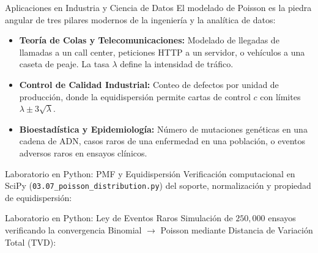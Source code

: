 \documentclass[10pt, aspectratio=169]{beamer}
\begin{document}
\begin{frame}{Aplicaciones en Industria y Ciencia de Datos}
  \footnotesize
  El modelado de Poisson es la piedra angular de tres pilares modernos de la ingeniería y la analítica de datos: \pause

  \vspace{0.15cm}
  \begin{itemize}\itemsep=0.15cm
    \item \textbf{Teoría de Colas y Telecomunicaciones:} Modelado de llegadas de llamadas a un call center, peticiones HTTP a un servidor, o vehículos a una caseta de peaje. La tasa $\lambda$ define la intensidad de tráfico. \pause
    \item \textbf{Control de Calidad Industrial:} Conteo de defectos por unidad de producción, donde la equidispersión permite cartas de control $c$ con límites $\lambda \pm 3\sqrt{\lambda}$. \pause
    \item \textbf{Bioestadística y Epidemiología:} Número de mutaciones genéticas en una cadena de ADN, casos raros de una enfermedad en una población, o eventos adversos raros en ensayos clínicos.
  \end{itemize}
\end{frame}

\begin{frame}[fragile]{Laboratorio en Python: PMF y Equidispersión}
  \scriptsize
  Verificación computacional en SciPy (\texttt{03.07\_poisson\_distribution.py}) del soporte, normalización y propiedad de equidispersión:
  \vspace{0.08cm}
  {
  }
\end{frame}

\begin{frame}[fragile]{Laboratorio en Python: Ley de Eventos Raros}
  \scriptsize
  Simulación de $250,000$ ensayos verificando la convergencia Binomial $\to$ Poisson mediante Distancia de Variación Total (TVD):
  \vspace{0.05cm}
  {
  }
\end{frame}
\end{document}
